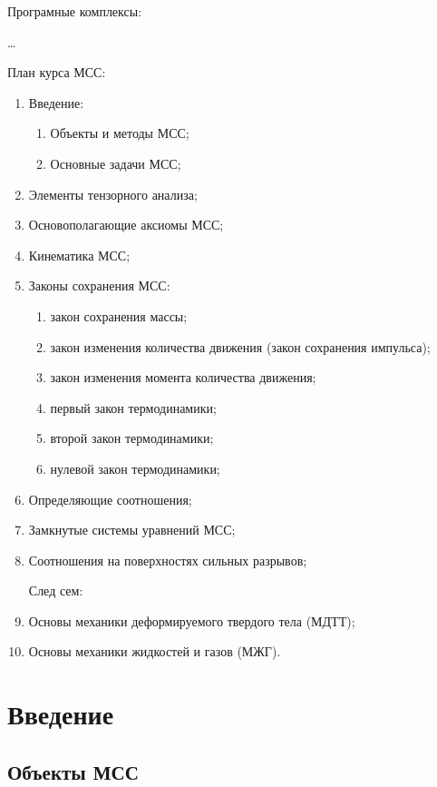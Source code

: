 
Програмные комплексы:

\dots

План курса МСС:
\begin{enumerate}
  \item Введение:
    \begin{enumerate}
      \item Объекты и методы МСС;
      \item Основные задачи МСС;
    \end{enumerate}

  \item Элементы тензорного анализа;
  \item Основополагающие аксиомы МСС;
  \item Кинематика МСС;
  \item Законы сохранения МСС:
    \begin{enumerate}
      \item закон сохранения массы;
      \item закон изменения количества движения (закон сохранения импульса);
      \item закон изменения момента количества движения;
      \item первый закон термодинамики;
      \item второй закон термодинамики;
      \item нулевой закон термодинамики;
    \end{enumerate}
  \item Определяющие соотношения;
  \item Замкнутые системы уравнений МСС;
  \item Соотношения на поверхностях сильных разрывов;

    След сем:
  \item Основы механики деформируемого твердого тела (МДТТ);
  \item Основы механики жидкостей и газов (МЖГ).
\end{enumerate}

\section{Введение}

\subsection{Объекты МСС}

